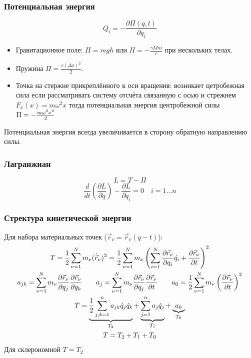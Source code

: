 \documentclass{article}
\begin{document}
\subsubsection{Потенциальная энергия}
\[
  Q_i=-\frac{\partial \Pi(q,t)}{\partial q_i}
\]
\begin{eg}
  \phantom{.}
  \begin{itemize}
    \item Гравитационное поле: $\Pi=mgh$ или $\Pi=-\frac{\gamma Mm}{r}$ при нескольких телах.
    \item Пружина $\Pi=\frac{c(\Delta x)^{2}}{2}$. 
    \item Точка на стержне прикреплённого к оси вращения: возникает цетробежная сила
    если рассматривать систему отсчёта связанную с осью и стрежнем $F_x(x)=m\omega^{2}x$
    тогда потенциальная энергия центробежной силы $\Pi=-\-\frac{m\omega^{2}x^{2}}{2}$
  \end{itemize}
\end{eg}
\begin{remark}
  Потенциальная энергия всегда увеличивается в сторону обратную направлению силы.
\end{remark}
\subsubsection{Лагранжиан}
\[
  L = T - \Pi
\]
\[\boxed{
  \frac{d}{dt}\left(\frac{\partial L}{\partial \dot{q}}\right) - \frac{\partial L}{ \partial q_i}=0 \quad i=1\dots n
}\]
\subsubsection{Стректура кинетической энергии}
Для набора материальных точек ($\vec{r}_\nu=\vec{r}_\nu(q-t)$):
\begin{gather*}
  T=\frac{1}{2}\sum_{\nu=1}^{N}m_\nu(\dot{\vec{r}}_\nu)^2=
  \frac{1}{2}\sum_{\nu=1}^{N}m_\nu\left(\sum_{i=1}^{N}\frac{\partial{\vec{r}_\nu}}{\partial{q_i}}\dot{q}_i+\frac{\partial{\vec{r}_\nu}}{\partial{t}}\right)^2 \\ 
  a_{jk}=\sum_{\nu=1}^{N}m_\nu\frac{\partial{\vec{r}_\nu}}{\partial{q_j}}\frac{\partial{\vec{r}_\nu}}{\partial{q_k}} \qquad 
  a_{j}=\sum_{\nu=1}^{N}m_\nu\frac{\partial{\vec{r}_\nu}}{\partial{q_j}}\frac{\partial{\vec{r}_\nu}}{\partial{t}} \qquad
  a_{0}=\frac{1}{2}\sum_{\nu=1}^{N}m_\nu\left(\frac{\partial{\vec{r}_\nu}}{\partial{t}}\right)^{2} \\ 
  T=\underbrace{\frac{1}{2}\sum_{j,k=1}^{n}a_{jk}\dot{q}_j\dot{q}_k}_{T_2} + \underbrace{\sum_{j=1}^{n}a_j\dot{q}_j}_{T_1}+\underbrace{a_0}_{T_0} \\ 
  T=T_2+T_1+T_0
\end{gather*}
Для склерономной $T=T_2$
\end{document}
